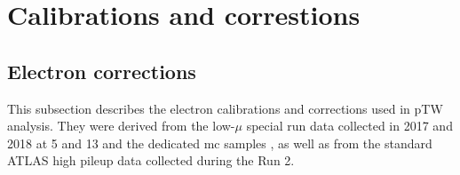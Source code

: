 \chapter{Calibrations and correstions}
    
    \section{Electron corrections}
    This subsection describes the electron calibrations and corrections used in pTW analysis. They were derived from the low-$\mu$ special run data collected in 2017 and 2018 at 5 and 13 \tev{} and the dedicated \gls{mc} samples \cite{Kretzschmar:2657141}, as well as from the standard ATLAS high pileup data collected during the Run 2.
